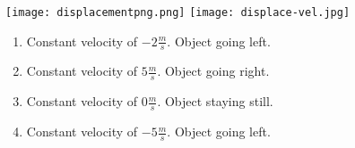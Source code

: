 \documentclass[12pt,fleqn]{book} %
\begin{document}
\pagebreak


\begin{multicols}{3}
    \hspace*{-10mm}
    \texttt{[image: displacementpng.png]}
    \columnbreak
    \hspace*{10mm}
    \texttt{[image: displace-vel.jpg]}

    \columnbreak
    \begin{enumerate}[label=(\alph*)]
        \item Constant velocity of $-2\frac{m}{s}$. \hspace*{-3mm} Object going left.
        \item Constant velocity of $5\frac{m}{s}$. \hspace*{-2mm} Object going right.
        \item Constant velocity of $0\frac{m}{s}$. \hspace*{-3mm} Object staying still.
        \item Constant velocity of $-5\frac{m}{s}$. \hspace*{-3mm} Object going left.
    \end{enumerate}

\end{multicols}
\end{document}
